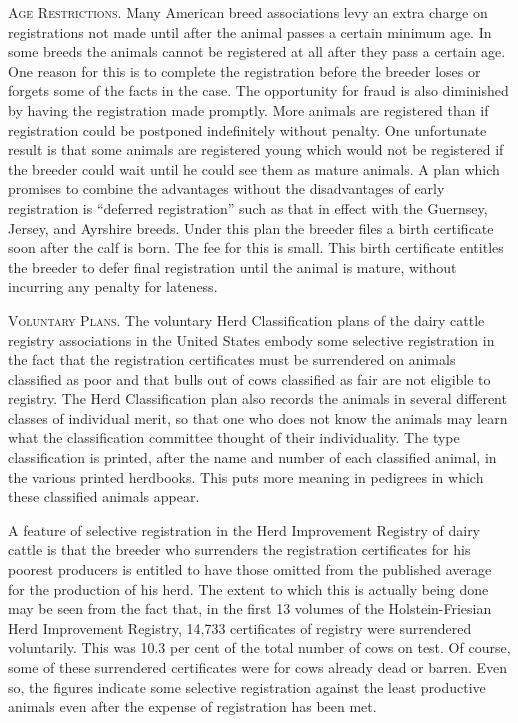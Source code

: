 \textsc{Age Restrictions}. Many American breed associations levy an extra
charge on registrations not made until after the animal passes a certain
minimum age. In some breeds the animals cannot be registered at all
after they pass a certain age. One reason for this is to complete the registration
before the breeder loses or forgets some of the facts in the case.
The opportunity for fraud is also diminished by having the registration
made promptly. More animals are registered than if registration could
be postponed indefinitely without penalty. One unfortunate result is
that some animals are registered young which would not be registered
if the breeder could wait until he could see them as mature animals. A
plan which promises to combine the advantages without the disadvantages
of early registration is ``deferred registration'' such as that in effect
with the Guernsey, Jersey, and Ayrshire breeds. Under this plan the
breeder files a birth certificate soon after the calf is born. The fee for
this is small. This birth certificate entitles the breeder to defer final
registration until the animal is mature, without incurring any penalty
for lateness.

\textsc{Voluntary Plans}. The voluntary Herd Classification plans of the
dairy cattle registry associations in the United States embody some
selective registration in the fact that the registration certificates must be
surrendered on animals classified as poor and that bulls out of cows
classified as fair are not eligible to registry. The Herd Classification
plan also records the animals in several different classes of individual
merit, so that one who does not know the animals may learn what the
classification committee thought of their individuality. The type classification
is printed, after the name and number of each classified animal,
in the various printed herdbooks. This puts more meaning in
pedigrees in which these classified animals appear.

A feature of selective registration in the Herd Improvement Registry
of dairy cattle is that the breeder who surrenders the registration
certificates for his poorest producers is entitled to have those omitted
from the published average for the production of his herd. The extent
to which this is actually being done may be seen from the fact that, in
the first 13 volumes of the Holstein-Friesian Herd Improvement Registry,
14,733 certificates of registry were surrendered voluntarily. This
was 10.3 per cent of the total number of cows on test. Of course, some of
these surrendered certificates were for cows already dead or barren.
Even so, the figures indicate some selective registration against the
least productive animals even after the expense of registration has
been met.

